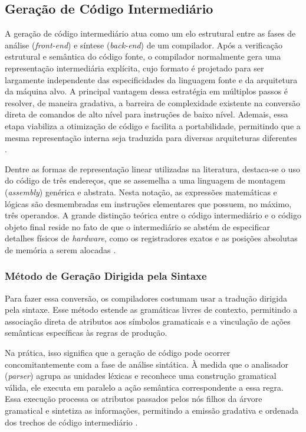 \subsection{Geração de Código Intermediário}

A geração de código intermediário atua como um elo estrutural entre as fases de análise (\textit{front-end}) e síntese (\textit{back-end}) de um compilador. Após a verificação estrutural e semântica do código fonte, o compilador normalmente gera uma representação intermediária explícita, cujo formato é projetado para ser largamente independente das especificidades da linguagem fonte e da arquitetura da máquina alvo. A principal vantagem dessa estratégia em múltiplos passos é resolver, de maneira gradativa, a barreira de complexidade existente na conversão direta de comandos de alto nível para instruções de baixo nível. Ademais, essa etapa viabiliza a otimização de código e facilita a portabilidade, permitindo que a mesma representação interna seja traduzida para diversas arquiteturas diferentes \cite{cooper2012,price2001}.

Dentre as formas de representação linear utilizadas na literatura, destaca-se o uso do código de três endereços, que se assemelha a uma linguagem de montagem (\textit{assembly}) genérica e abstrata. Nesta notação, as expressões matemáticas e lógicas são desmembradas em instruções elementares que possuem, no máximo, três operandos. A grande distinção teórica entre o código intermediário e o código objeto final reside no fato de que o intermediário se abstém de especificar detalhes físicos de \textit{hardware}, como os registradores exatos e as posições absolutas de memória a serem alocadas \cite{nystrom2021}.

\subsubsection*{Método de Geração Dirigida pela Sintaxe}

Para fazer essa conversão, os compiladores costumam usar a tradução dirigida pela sintaxe. Esse método estende as gramáticas livres de contexto, permitindo a associação direta de atributos aos símbolos gramaticais e a vinculação de ações semânticas específicas às regras de produção.

Na prática, isso significa que a geração de código pode ocorrer concomitantemente com a fase de análise sintática. À medida que o analisador (\textit{parser}) agrupa as unidades léxicas e reconhece uma construção gramatical válida, ele executa em paralelo a ação semântica correspondente a essa regra. Essa execução processa os atributos passados pelos nós filhos da árvore gramatical e sintetiza as informações, permitindo a emissão gradativa e ordenada dos trechos de código intermediário \cite{cooper2012}.

